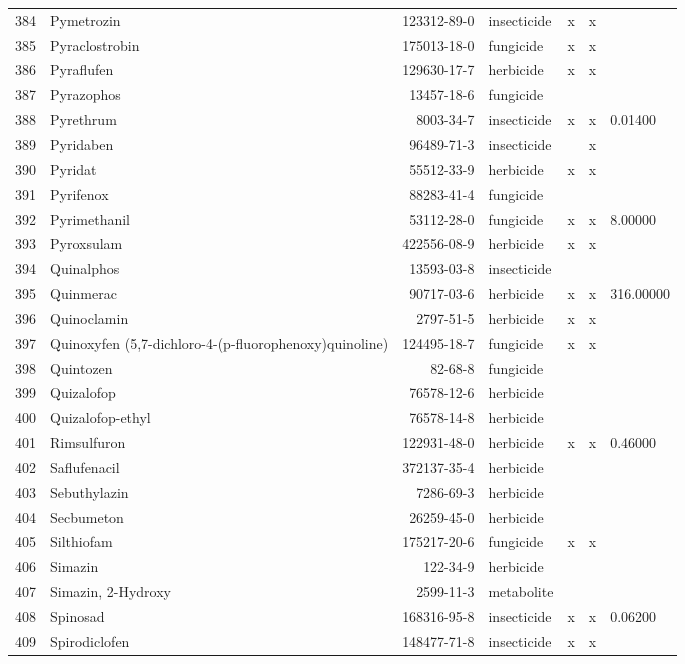 \begin{longtable}{lp{4cm}rlp{1.3cm}p{1.3cm}p{1.5cm}}
  384 & Pymetrozin & 123312-89-0 & insecticide & x & x &  \\ 
  385 & Pyraclostrobin & 175013-18-0 & fungicide & x & x &  \\ 
  386 & Pyraflufen & 129630-17-7 & herbicide & x & x &  \\ 
  387 & Pyrazophos & 13457-18-6 & fungicide &  &  &  \\ 
  388 & Pyrethrum & 8003-34-7 & insecticide & x & x & 0.01400 \\ 
  389 & Pyridaben & 96489-71-3 & insecticide &  & x &  \\ 
  390 & Pyridat & 55512-33-9 & herbicide & x & x &  \\ 
  391 & Pyrifenox & 88283-41-4 & fungicide &  &  &  \\ 
  392 & Pyrimethanil & 53112-28-0 & fungicide & x & x & 8.00000 \\ 
  393 & Pyroxsulam & 422556-08-9 & herbicide & x & x &  \\ 
  394 & Quinalphos & 13593-03-8 & insecticide &  &  &  \\ 
  395 & Quinmerac & 90717-03-6 & herbicide & x & x & 316.00000 \\ 
  396 & Quinoclamin & 2797-51-5 & herbicide & x & x &  \\ 
  397 & Quinoxyfen (5,7-dichloro-4-(p-fluorophenoxy)quinoline) & 124495-18-7 & fungicide & x & x &  \\ 
  398 & Quintozen & 82-68-8 & fungicide &  &  &  \\ 
  399 & Quizalofop & 76578-12-6 & herbicide &  &  &  \\ 
  400 & Quizalofop-ethyl & 76578-14-8 & herbicide &  &  &  \\ 
  401 & Rimsulfuron & 122931-48-0 & herbicide & x & x & 0.46000 \\ 
  402 & Saflufenacil & 372137-35-4 & herbicide &  &  &  \\ 
  403 & Sebuthylazin & 7286-69-3 & herbicide &  &  &  \\ 
  404 & Secbumeton & 26259-45-0 & herbicide &  &  &  \\ 
  405 & Silthiofam & 175217-20-6 & fungicide & x & x &  \\ 
  406 & Simazin & 122-34-9 & herbicide &  &  &  \\ 
  407 & Simazin, 2-Hydroxy & 2599-11-3 & metabolite &  &  &  \\ 
  408 & Spinosad & 168316-95-8 & insecticide & x & x & 0.06200 \\ 
  409 & Spirodiclofen & 148477-71-8 & insecticide & x & x &  \\ 

\end{longtable}
